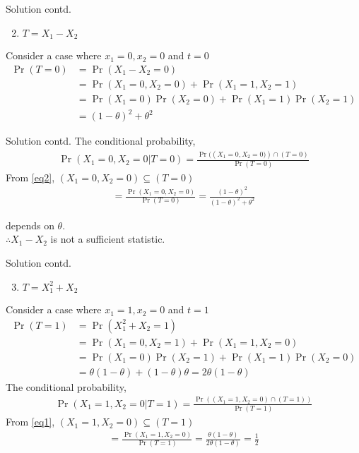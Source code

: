 \documentclass{beamer}
\providecommand{\brak}[1]{\ensuremath{\left(#1\right)}}
\begin{document}
\begin{frame}{Solution contd.}
\begin{enumerate}
\setcounter{enumi}{1}
    \item $T=X_1-X_2$
\end{enumerate}
    Consider a case where $x_1=0, x_2=0$ and $t=0$
    \begin{align}
        \Pr{(T=0)}&=\Pr{(X_1-X_2=0)}\\
        \label{eq2}&= \Pr{(X_1=0,X_2=0)}+ \Pr{(X_1=1,X_2=1)}\\
        &= \Pr{(X_1=0)} \Pr{(X_2=0)}+ \Pr{(X_1=1)} \Pr{(X_2=1)}\\ &=\brak{1-\theta}^2 + \theta^2
    \end{align}
\end{frame}
\begin{frame}{Solution contd.}
    The conditional probability,
    \begin{align}
         \Pr{(X_1=0,X_2=0 | T=0)}
        =\frac{ \Pr{(\brak{X_1=0,X_2=0)}\cap\brak{T=0}}}{ \Pr{(T=0)}}
    \end{align}
    From \eqref{eq2}, $\brak{X_1=0,X_2=0} \subseteq \brak{T=0}$
    \begin{align}
        =\frac{ \Pr{(X_1=0,X_2=0)}}{ \Pr{(T=0)}}=\frac{\brak{1-\theta}^2}{\brak{1-\theta}^2 + \theta^2}
    \end{align}
  
    depends on $\theta$. \\
    $\therefore X_1-X_2$ is not a sufficient statistic.
\end{frame}
\begin{frame}{Solution contd.}
\begin{enumerate}
\setcounter{enumi}{2}
    \item $T=X_1^2+X_2$
\end{enumerate}
    
    Consider a case where $x_1=1, x_2=0$ and $t=1$
    \begin{align}
    \Pr{(T=1)}&=\Pr{(X_1^2+X_2=1)}\\
    \label{eq1}&=\Pr{(X_1=0,X_2=1)}+\Pr{(X_1=1,X_2=0)}\\
    &= \Pr{(X_1=0)} \Pr{(X_2=1)}+ \Pr{(X_1=1)} \Pr{(X_2=0)}\\ 
    &=\theta \brak{1-\theta} + \brak{1-\theta}\theta  = 2\theta \brak{1-\theta}
    \end{align}
   The conditional probability,
    \begin{align}
        \Pr{(X_1=1,X_2=0 | T=1)}
        =\frac{\Pr{(\brak{X_1=1,X_2=0}\cap\brak{T=1})}}{\Pr{(T=1)}}
    \end{align}
    From \eqref{eq1}, $\brak{X_1=1,X_2=0} \subseteq \brak{T=1}$
    \begin{align}
        =\frac{\Pr{(X_1=1,X_2=0)}}{\Pr{(T=1)}}=\frac{\theta \brak{1-\theta}}{2\theta \brak{1-\theta}}=\frac{1}{2}
    \end{align}
\end{frame}
\end{document}
